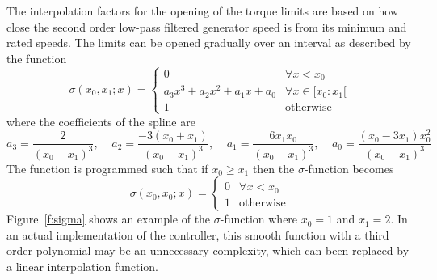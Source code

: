The interpolation factors for the opening of the torque limits are based on how close the second order low-pass filtered generator speed is from its minimum and rated speeds. The limits can be opened gradually over an interval as described by the function
\begin{equation}\label{e:sigma}
\sigma\left(x_0,x_1;x\right) = \left\{
\begin{array}{rl}
0 & \forall x<x_0 \\
a_3x^3 + a_2x^2 + a_1x + a_0& \forall x\in[x_0:x_1[\\
1 & \mbox{otherwise}
\end{array} \right.
\end{equation}
where the coefficients of the spline are
\begin{equation}\label{e:sigmacoef}
a_3=\frac{2}{\left(x_0-x_1\right)^3}, \;\;\;\;
a_2=\frac{-3 \left(x_0+x_1\right)}{\left(x_0-x_1\right)^3}, \;\;\;\;
a_1=\frac{6 x_1 x_0}{\left(x_0-x_1\right)^3}, \;\;\;\;
a_0=\frac{\left(x_0-3 x_1\right) x_0^2}{\left(x_0-x_1\right)^3}
\end{equation}
The function is programmed such that if $x_0 \geq x_1$ then the $\sigma$-function becomes
\begin{equation}\label{e:sigma_if}
\sigma\left(x_0,x_0;x\right) = \left\{
\begin{array}{rl}
0 & \forall x<x_0 \\
1 & \mbox{otherwise}
\end{array} \right.
\end{equation}
Figure~\ref{f:sigma} shows an example of the $\sigma$-function where $x_0=1$ and $x_1=2$. In an actual implementation of the controller, this smooth function with a third order polynomial may be an unnecessary complexity, which can been replaced by a linear interpolation function.

